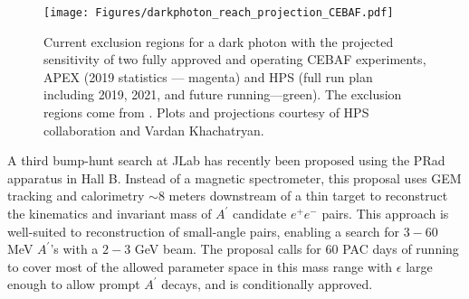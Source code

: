 \begin{figure}[htbp]
\begin{center}
  \texttt{[image: Figures/darkphoton\_reach\_projection\_CEBAF.pdf]}
  \caption{Current exclusion regions for a dark photon with the projected sensitivity of two fully approved and operating CEBAF experiments, APEX (2019 statistics --- magenta) and HPS (full run plan including 2019, 2021, and future running---green).  The exclusion regions come from \cite{Konaka:1986cb,Riordan:1987aw,Bjorken:1988as,
     Bross:1989mp,Davier:1989wz, Bjorken:2009mm, Abrahamyan:2011gv, Archilli:2011zc, Andreas:2012mt, Babusci:2012cr, Agakishiev:2013fwl, Adare:2014mgk, KLOE-2:2014qxg, Lees:2014xha, Merkel:2014avp, Adrian:2018scb,  Aaij:2017rft, LHCb:2019vmc}. Plots and projections courtesy of HPS collaboration and Vardan Khachatryan.}
  \label{fig:darkPhotonProj}
\end{center}
\end{figure}
 A third bump-hunt search at JLab has recently been proposed using the PRad apparatus in Hall B.  Instead of a magnetic spectrometer, this proposal uses GEM tracking and calorimetry $\sim 8$ meters downstream of a thin target to reconstruct the kinematics and invariant mass of $A^\prime$ candidate $e^+e^-$ pairs.  This approach is well-suited to reconstruction of small-angle pairs, enabling a search for $3-60$ MeV $A^\prime$'s with a $2-3$ GeV beam.  The proposal calls for 60 PAC days of running to cover most of the allowed parameter space in this mass range with $\epsilon$ large enough to allow prompt $A^\prime$ decays, and is conditionally approved.
 
